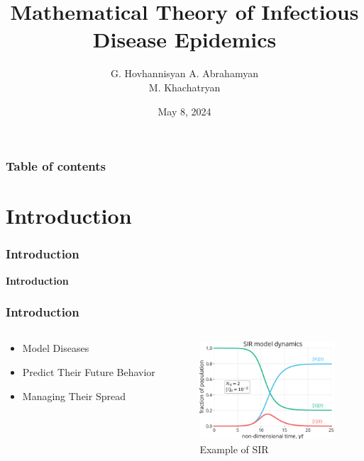 \documentclass{beamer}
\begin{document}
\title{Mathematical Theory of Infectious Disease Epidemics}
\author{G. Hovhannisyan  A. Abrahamyan\\
M. Khachatryan}
\date{May 8, 2024}


\begin{frame}
\titlepage
\end{frame}

\begin{frame}\frametitle{Table of contents}\tableofcontents
\end{frame}


\section{Introduction}
\begin{frame}\frametitle{Introduction}
    \begin{center}
        \textbf{Introduction}
    \end{center}
    \end{frame}

\begin{frame}\frametitle{Introduction}
\begin{center}
    \begin{columns}
        \begin{column}{5cm}
        \begin{itemize}
        \item Model Diseases
        \item Predict Their Future Behavior
        \item Managing Their Spread
        \end{itemize}
        \end{column}
        \begin{column}{5cm}
        \begin{figure}
            \caption{Example of SIR}
	        \centering
	        \includegraphics[width=5cm]{Figure_SIR.png}
        \end{figure}
        \end{column}
        \end{columns}

\end{center}
\end{frame}
\end{document}
